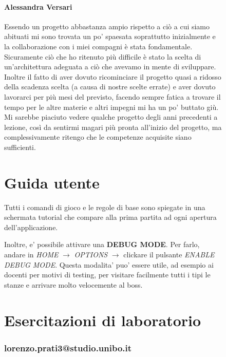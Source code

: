 \documentclass[a4paper,12pt]{report}
\begin{document}
\begin{figure}[h]
\subsubsection{Alessandra Versari}
Essendo un progetto abbastanza ampio rispetto a ciò a cui siamo abituati mi sono trovata un po' spaesata soprattutto inizialmente e la collaborazione con i miei compagni è stata fondamentale. Sicuramente ciò che ho ritenuto più difficile è stato la scelta di un'architettura adeguata a ciò che avevamo in mente di sviluppare.
Inoltre il fatto di aver dovuto ricominciare il progetto quasi a ridosso della scadenza scelta (a causa di nostre scelte errate) e aver dovuto lavorarci per più mesi del previsto, facendo sempre fatica a trovare il tempo per le altre materie e altri impegni mi ha un po' buttato giù.
Mi sarebbe piaciuto vedere qualche progetto degli anni precedenti a lezione, così da sentirmi magari più pronta all'inizio del progetto, ma complessivamente ritengo che le competenze acquisite siano sufficienti.

\chapter{Guida utente}
Tutti i comandi di gioco e le regole di base sono spiegate in una schermata tutorial che compare alla prima partita ad ogni apertura dell'applicazione.

Inoltre, e' possibile attivare una \textbf{DEBUG MODE}. Per farlo, andare in \textit{HOME} $\rightarrow$ \textit{OPTIONS} $\rightarrow$ clickare il pulsante \textit{ENABLE DEBUG MODE}. Questa modalita' puo' essere utile, ad esempio ai docenti per motivi di testing, per visitare facilmente tutti i tipi le stanze e arrivare molto velocemente al boss.

\chapter{Esercitazioni di laboratorio}

\subsection{lorenzo.prati3@studio.unibo.it}


\end{figure}
\end{document}
